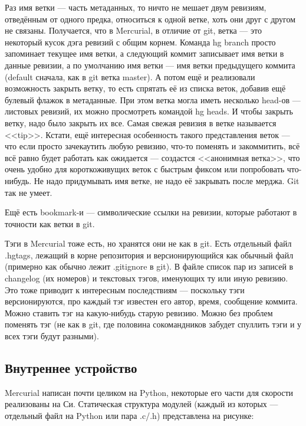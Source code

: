 \documentclass[a5paper]{article}
\begin{document}
Раз имя ветки --- часть метаданных, то ничто не мешает двум ревизиям, отведённым от одного предка, относиться к одной ветке, хоть они друг с другом не связаны. Получается, что в Mercurial, в отличие от git, ветка --- это некоторый кусок дэга ревизий с общим корнем. Команда hg branch просто запоминает текущее имя ветки, а следующий коммит записывает имя ветки в данные ревизии, а по умолчанию имя ветки --- имя ветки предыдущего коммита (default сначала, как в git ветка master). А потом ещё и реализовали возможность закрыть ветку, то есть спрятать её из списка веток, добавив ещё булевый флажок в метаданные. При этом ветка могла иметь несколько head-ов --- листовых ревизий, их можно просмотреть командой hg heads. И чтобы закрыть ветку, надо было закрыть их все. Самая свежая ревизия в ветке называется <<tip>>. Кстати, ещё интересная особенность такого представления веток --- что если просто зачекаутить любую ревизию, что-то поменять и закоммитить, всё всё равно будет работать как ожидается --- создастся <<анонимная ветка>>, что очень удобно для короткоживущих веток с быстрым фиксом или попробовать что-нибудь. Не надо придумывать имя ветке, не надо её закрывать после мерджа. Git так не умеет.

Ещё есть bookmark-и --- символические ссылки на ревизии, которые работают в точности как ветки в git.

Тэги в Mercurial тоже есть, но хранятся они не как в git. Есть отдельный файл .hgtags, лежащий в корне репозитория и версионирующийся как обычный файл (примерно как обычно лежит .gitignore в git). В файле список пар из записей в changelog (их номеров) и текстовых тэгов, именующих ту или иную ревизию. Это тоже приводит к интересным последствиям --- поскольку тэги версионируются, про каждый тэг известен его автор, время, сообщение коммита. Можно ставить тэг на какую-нибудь старую ревизию. Можно без проблем поменять тэг (не как в git, где половина сокомандников забудет спуллить тэги и у всех тэги будут разными).

\subsection{Внутреннее устройство}

Mercurial написан почти целиком на Python, некоторые его части для скорости реализованы на Си. Статическая структура модулей (каждый из которых --- отдельный файл на Python или пара .c/.h) представлена на рисунке:
\end{document}
